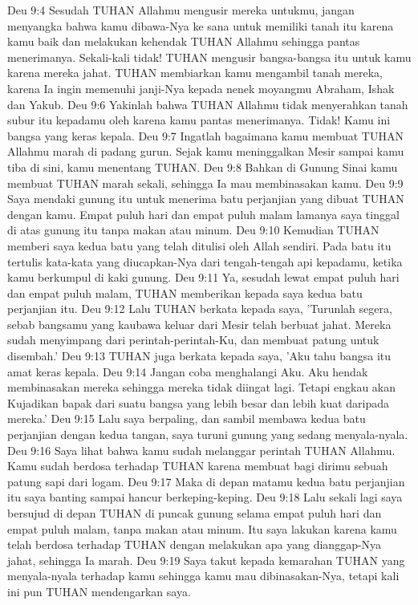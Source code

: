 Deu 9:4  Sesudah TUHAN Allahmu mengusir mereka untukmu, jangan menyangka bahwa kamu dibawa-Nya ke sana untuk memiliki tanah itu karena kamu baik dan melakukan kehendak TUHAN Allahmu sehingga pantas menerimanya. Sekali-kali tidak! TUHAN mengusir bangsa-bangsa itu untuk kamu karena mereka jahat. TUHAN membiarkan kamu mengambil tanah mereka, karena Ia ingin memenuhi janji-Nya kepada nenek moyangmu Abraham, Ishak dan Yakub.
Deu 9:6  Yakinlah bahwa TUHAN Allahmu tidak menyerahkan tanah subur itu kepadamu oleh karena kamu pantas menerimanya. Tidak! Kamu ini bangsa yang keras kepala.
Deu 9:7  Ingatlah bagaimana kamu membuat TUHAN Allahmu marah di padang gurun. Sejak kamu meninggalkan Mesir sampai kamu tiba di sini, kamu menentang TUHAN.
Deu 9:8  Bahkan di Gunung Sinai kamu membuat TUHAN marah sekali, sehingga Ia mau membinasakan kamu.
Deu 9:9  Saya mendaki gunung itu untuk menerima batu perjanjian yang dibuat TUHAN dengan kamu. Empat puluh hari dan empat puluh malam lamanya saya tinggal di atas gunung itu tanpa makan atau minum.
Deu 9:10  Kemudian TUHAN memberi saya kedua batu yang telah ditulisi oleh Allah sendiri. Pada batu itu tertulis kata-kata yang diucapkan-Nya dari tengah-tengah api kepadamu, ketika kamu berkumpul di kaki gunung.
Deu 9:11  Ya, sesudah lewat empat puluh hari dan empat puluh malam, TUHAN memberikan kepada saya kedua batu perjanjian itu.
Deu 9:12  Lalu TUHAN berkata kepada saya, 'Turunlah segera, sebab bangsamu yang kaubawa keluar dari Mesir telah berbuat jahat. Mereka sudah menyimpang dari perintah-perintah-Ku, dan membuat patung untuk disembah.'
Deu 9:13  TUHAN juga berkata kepada saya, 'Aku tahu bangsa itu amat keras kepala.
Deu 9:14  Jangan coba menghalangi Aku. Aku hendak membinasakan mereka sehingga mereka tidak diingat lagi. Tetapi engkau akan Kujadikan bapak dari suatu bangsa yang lebih besar dan lebih kuat daripada mereka.'
Deu 9:15  Lalu saya berpaling, dan sambil membawa kedua batu perjanjian dengan kedua tangan, saya turuni gunung yang sedang menyala-nyala.
Deu 9:16  Saya lihat bahwa kamu sudah melanggar perintah TUHAN Allahmu. Kamu sudah berdosa terhadap TUHAN karena membuat bagi dirimu sebuah patung sapi dari logam.
Deu 9:17  Maka di depan matamu kedua batu perjanjian itu saya banting sampai hancur berkeping-keping.
Deu 9:18  Lalu sekali lagi saya bersujud di depan TUHAN di puncak gunung selama empat puluh hari dan empat puluh malam, tanpa makan atau minum. Itu saya lakukan karena kamu telah berdosa terhadap TUHAN dengan melakukan apa yang dianggap-Nya jahat, sehingga Ia marah.
Deu 9:19  Saya takut kepada kemarahan TUHAN yang menyala-nyala terhadap kamu sehingga kamu mau dibinasakan-Nya, tetapi kali ini pun TUHAN mendengarkan saya.
